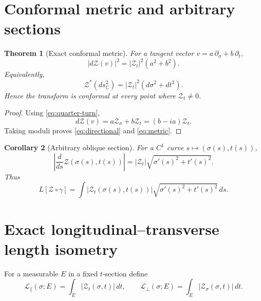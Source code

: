 \documentclass[11pt]{amsart}
\numberwithin{equation}{section}
\newtheorem{theorem}{Theorem}[section]
\newtheorem{corollary}[theorem]{Corollary}
\newcommand{\C}{\mathbb C}
\newcommand{\Zcal}{\mathcal Z}
\newcommand{\dd}{\,d}
\begin{document}
\section{Conformal metric and arbitrary sections}

\begin{theorem}[Exact conformal metric]
For a tangent vector $v=a\,\partial_\sigma+b\,\partial_t$,
\begin{equation}
\boxed{|d\Zcal(v)|^2=|\Zcal_t|^2(a^2+b^2).}
\label{eq:directional}
\end{equation}
Equivalently,
\begin{equation}
\boxed{
\Zcal^*(ds_\C^2)=|\Zcal_t|^2(d\sigma^2+dt^2).
}
\label{eq:metric}
\end{equation}
Hence the transform is conformal at every point where $\Zcal_t\ne0$.
\end{theorem}

\begin{proof}
Using \eqref{eq:quarter-turn},
\[
d\Zcal(v)=a\Zcal_\sigma+b\Zcal_t=(b-ia)\Zcal_t.
\]
Taking moduli proves \eqref{eq:directional} and \eqref{eq:metric}.
\end{proof}

\begin{corollary}[Arbitrary oblique section]
For a $C^1$ curve $s\mapsto(\sigma(s),t(s))$,
\begin{equation}
\boxed{
\left|\frac{d}{ds}\Zcal(\sigma(s),t(s))\right|
=|\Zcal_t|\sqrt{\sigma'(s)^2+t'(s)^2}.
}
\label{eq:oblique-speed}
\end{equation}
Thus
\begin{equation}
L[\Zcal\circ\gamma]
=\int |\Zcal_t(\sigma(s),t(s))|
\sqrt{\sigma'(s)^2+t'(s)^2}\dd s.
\label{eq:oblique-length}
\end{equation}
\end{corollary}

\section{Exact longitudinal--transverse length isometry}

For a measurable $E$ in a fixed $t$-section define
\[
\mathcal L_\parallel(\sigma;E)=\int_E|\Zcal_t(\sigma,t)|\dd t,
\qquad
\mathcal L_\perp(\sigma;E)=\int_E|\Zcal_\sigma(\sigma,t)|\dd t.
\]
\end{document}
